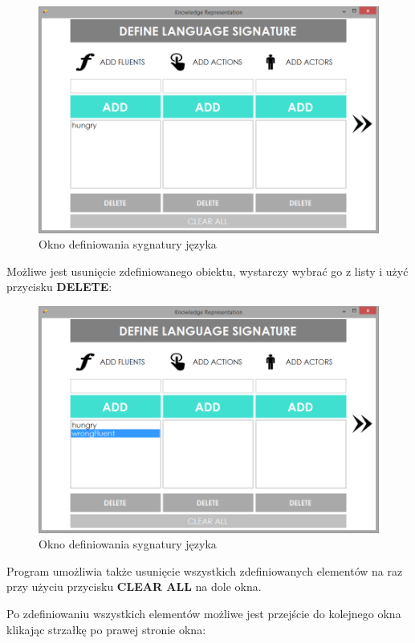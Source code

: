 \documentclass{article}
\begin{document}
\begin{figure}[H]
\centering
\includegraphics[scale=0.4]{03}
\caption{Okno definiowania sygnatury języka}
\end{figure}

Możliwe jest usunięcie zdefiniowanego obiektu, wystarczy wybrać go z listy i użyć przycisku \textbf{DELETE}:

\begin{figure}[H]
\centering
\includegraphics[scale=0.4]{04}
\caption{Okno definiowania sygnatury języka}
\end{figure}

Program umożliwia także usunięcie wszystkich zdefiniowanych elementów na raz przy użyciu przycisku \textbf{CLEAR ALL} na dole okna.
\newpage

Po zdefiniowaniu wszystkich elementów możliwe jest przejście do kolejnego okna klikając strzałkę po prawej stronie okna:
\end{document}
